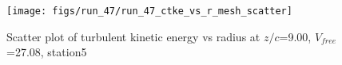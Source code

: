 \begin{figure}[H]
\centering
\texttt{[image: figs/run\_47/run\_47\_ctke\_vs\_r\_mesh\_scatter]}
\caption{Scatter plot of turbulent kinetic energy vs radius at $z/c$=9.00, $V_{free}$=27.08, station5}
\label{fig:run_47_ctke_vs_r_mesh_scatter}
\end{figure}


